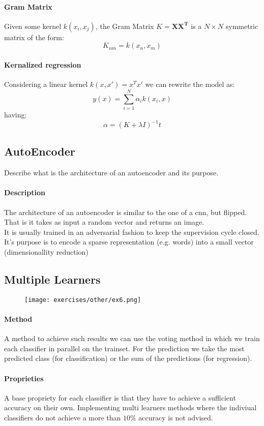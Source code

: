 \paragraph{Gram Matrix}
Given some kernel $k(x_i,x_j)$, the Gram Matrix $K=\bm{XX^T}$ is a $N\times N$ symmetric matrix of the form:
\[K_{nm}=k(x_n,x_m)\]

\paragraph{Kernalized regression}
Considering a linear kernel $k(x,x')=x^Tx'$ we can rewrite the model as:
\[y(x)=\sum_{i=1}^N\alpha_i k(x_i,x)\]
having:
\[\alpha=(K+\lambda I)^{-1}t\]


\subsection{AutoEncoder}
Describe what is the architecture of an autoencoder and its purpose.

\paragraph{Description}
The architecture of an autoencoder is similar to the one of a cnn, but flipped. That is it takes as input a random vector and returns an image.\\
It is usually trained in an adversarial fashion to keep the supervision cycle closed.\\
It's purpose is to encode a sparse representation (e.g. words) into a small vector (dimensionallity reduction)

\subsection{Multiple Learners}

\begin{figure}[H]
    \centering
    \texttt{[image: exercises/other/ex6.png]}
\end{figure}

\paragraph{Method}
A method to achieve such results we can use the voting method in which we train each classifier in parallel on the trainset. For the prediction we take the most predicted class (for classification) or the sum of the predictions (for regression).

\paragraph{Proprieties}
A base propriety for each classifier is that they have to achieve a sufficient accuracy on their own. Implementing multi learners methods where the indiviual classifiers do not achieve a more than $10\%$ accuracy is not advised.


